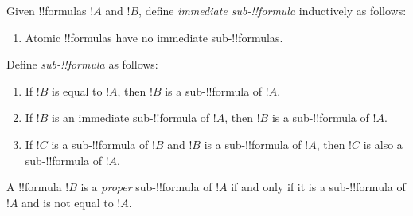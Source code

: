 \documentclass[../../include/open-logic-section]{subfiles}
\begin{document}
\begin{defn}
Given !!{formula}s $!A$ and $!B$, define \emph{immediate sub-!!{formula}}
inductively as follows:
\begin{enumerate}
\item Atomic !!{formula}s have no immediate sub-!!{formula}s.







\end{enumerate}
\end{defn}


\begin{defn}
Define \emph{sub-!!{formula}} as follows:
\begin{enumerate}
\item If $!B$ is equal to $!A$, then $!B$ is a sub-!!{formula} of $!A$.
\item If $!B$ is an immediate sub-!!{formula} of $!A$, then $!B$ is a
  sub-!!{formula} of $!A$.
\item If $!C$ is a sub-!!{formula} of $!B$ and $!B$ is a sub-!!{formula} of
  $!A$, then $!C$ is also a sub-!!{formula} of $!A$.
\end{enumerate}
A !!{formula} $!B$ is a \emph{proper} sub-!!{formula} of $!A$ if and only if it
is a sub-!!{formula} of $!A$ and is not equal to $!A$.
\end{defn}

\end{document}
